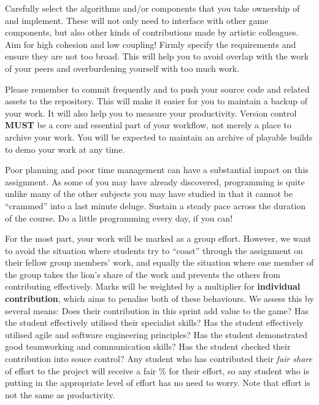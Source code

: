 \documentclass{../../fal_assignment}
\begin{document}
Carefully select the algorithms and/or components that you take ownership of and implement. These will not only need to interface with other game components, but also other kinds of contributions made by artistic colleagues. Aim for high cohesion and low coupling! Firmly specify the requirements and ensure they are not too broad. This will help you to avoid overlap with the work of your peers and overburdening yourself with too much work. 

Please remember to commit frequently and to push your source code and related assets to the repository. This will make it easier for you to maintain a backup of your work. It will also help you to measure your productivity. Version control \textbf{MUST} be a core and essential part of your workflow, not merely a place to archive your work. You will be expected to maintain an archive of playable builds to demo your work at any time.

Poor planning and poor time management can have a substantial impact on this assignment. As some of you may have already discovered, programming is quite unlike many of the other subjects you may have studied in that it cannot be ``crammed'' into a last minute deluge. Sustain a steady pace across the duration of the course. Do a little programming every day, if you can!

For the most part, your work will be marked as a group effort.
However, we want to avoid the situation where students try to ``coast'' through the assignment
on their fellow group members' work,
and equally the situation where one member of the group takes the lion's share of the work
and prevents the others from contributing effectively.
Marks will be weighted by a multiplier for \textbf{individual contribution},
which aims to penalise both of these behaviours.
We assess this by several means: Does their contribution in this sprint add value to the game? Has the student effectively utilised their specialist skills? Has the student effectively utilised agile and software engineering principles? Has the student demonstrated good teamworking and communication skills? Has the student checked their contribution into souce control? Any student who has contributed their \textit{fair share} of effort to the project will receive a fair \% for their effort,
so any student who is putting in the appropriate level of effort has no need to worry. Note that effort is not the same as productivity.

\end{document}
